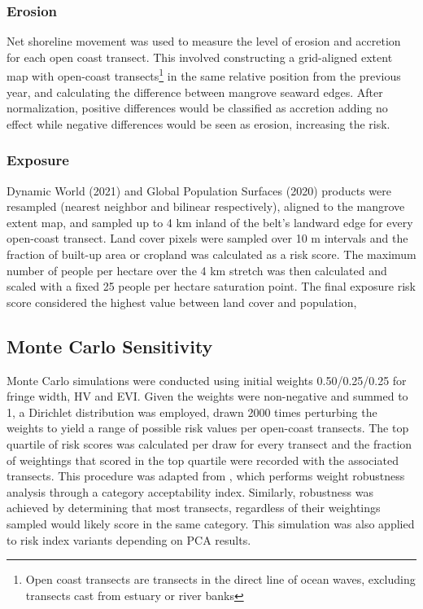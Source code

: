 \documentclass[final-report]{report-template}
\begin{document}
\subsubsection{Erosion}
Net shoreline movement was used to measure the level of erosion and accretion for each open coast transect. This involved constructing a grid-aligned extent map with open-coast transects\footnote{Open coast transects are transects in the direct line of ocean waves, excluding transects cast from estuary or river banks} in the same relative position from the previous year, and calculating the difference between mangrove seaward edges. After normalization, positive differences would be classified as accretion adding no effect while negative differences would be seen as erosion, increasing the risk.  

\subsubsection{Exposure}
Dynamic World (2021) and Global Population Surfaces (2020) products were resampled (nearest neighbor and bilinear respectively), aligned to the mangrove extent map, and sampled up to 4 km inland of the belt's landward edge for every open-coast transect. Land cover pixels were sampled over 10 m intervals and the fraction of built-up area or cropland was calculated as a risk score. The maximum number of people per hectare over the 4 km stretch was then calculated and scaled with a fixed 25 people per hectare saturation point. The final exposure risk score considered the highest value between land cover and population, 

\subsection{Monte Carlo Sensitivity}
Monte Carlo simulations were conducted using initial weights 0.50/0.25/0.25 for fringe width, HV and EVI. Given the weights were non-negative and summed to 1, a Dirichlet distribution was employed, drawn 2000 times perturbing the weights to yield a range of possible risk values per open-coast transects. The top quartile of risk scores was calculated per draw for every transect and the fraction of weightings that scored in the top quartile were recorded with the associated transects. This procedure was adapted from \textcite{Tervonen2009}, which performs weight robustness analysis through a category acceptability index. Similarly,  robustness was achieved by determining that most transects, regardless of their weightings sampled would likely score in the same category. This simulation was also applied to risk index variants depending on PCA results.
\end{document}
